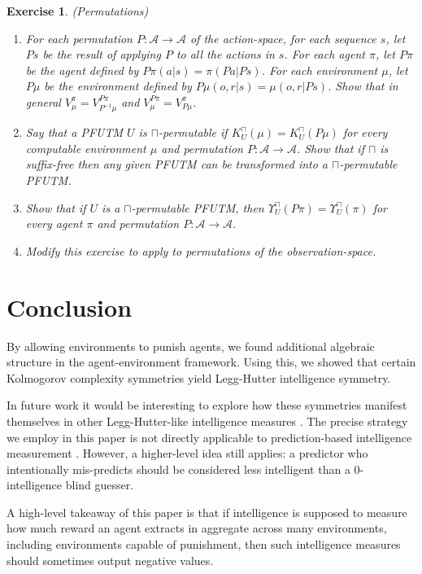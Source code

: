 \documentclass[runningheads]{llncs}
\newtheorem{myexercise}[mytheorem]{Exercise}
\def\LH{\Upsilon}
\begin{document}
\begin{myexercise} (Permutations)
    \begin{enumerate}
        \item
        For each permutation $P:\mathcal A\to\mathcal A$ of the action-space,
        for each sequence $s$,
        let $Ps$ be the result of applying $P$ to all the actions in $s$.
        For each agent $\pi$, let $P\pi$ be the agent defined by
        $P\pi(a|s)=\pi(Pa|Ps)$. For each environment $\mu$, let
        $P\mu$ be the environment defined by
        $P\mu(o,r|s)=\mu(o,r|Ps)$. Show that in general
        $V^\pi_\mu = V^{P\pi}_{P^{-1}\mu}$
        and
        $V^{P\pi}_\mu = V^\pi_{P\mu}$.
        \item
        Say that a PFUTM $U$ is \emph{$\sqcap$-permutable} if
        $K^\sqcap_U(\mu)=K^\sqcap_U(P\mu)$ for every computable environment $\mu$
        and permutation $P:\mathcal A\to\mathcal A$. Show that if $\sqcap$ is
        suffix-free then any given
        PFUTM can be transformed into a $\sqcap$-permutable PFUTM.
        \item
        Show that if $U$ is a $\sqcap$-permutable PFUTM,
        then $\LH^\sqcap_U(P\pi)=\LH^\sqcap_U(\pi)$
        for every agent $\pi$ and permutation $P:\mathcal A\to\mathcal A$.
        \item
        Modify this exercise to apply to permutations
        of the observation-space.
    \end{enumerate}
\end{myexercise}

\section{Conclusion}
\label{conclusionsecn}

By allowing environments to punish agents,
we found additional algebraic structure in the agent-environment
framework. Using this, we showed
that certain Kolmogorov complexity symmetries yield
Legg-Hutter intelligence symmetry.

In future work it would be interesting to explore how these symmetries
manifest themselves in other Legg-Hutter-like intelligence measures
\cite{gavane} \cite{goertzel2006patterns} \cite{hernandez}.
The precise strategy we employ in this
paper is not directly applicable to prediction-based intelligence measurement
\cite{hibbard} \cite{alexander2021measuring}
\cite{gamez2021measuring}. However, a higher-level
idea still applies:
a predictor who intentionally mis-predicts
should be considered less intelligent than a $0$-intelligence blind guesser.

A high-level takeaway of
this paper is that if intelligence is supposed to measure how much
reward an agent extracts in aggregate across many environments,
including environments capable of punishment, then such
intelligence measures should sometimes output negative
values.




\end{document}
